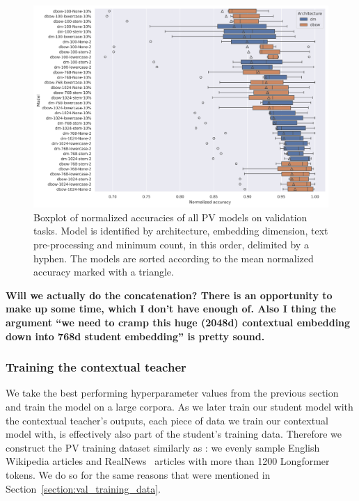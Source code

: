 \begin{figure}
    \includegraphics[width=\textwidth]{./img/pv_val_scores.png}

    \caption{Boxplot of normalized accuracies of all PV models on validation
    tasks. Model is identified by architecture, embedding dimension, text
    pre-processing and minimum count, in this order, delimited by a hyphen. The
    models are sorted according to the mean normalized accuracy marked with a
    triangle.}

    \label{fig:pv_val_scores}
\end{figure}

\textbf{Will we actually do the concatenation? There is an opportunity to make
up some time, which I don't have enough of. Also I thing the argument ``we need
to cramp this huge (2048d) contextual embedding down into 768d student
embedding'' is pretty sound.}

\subsubsection{Training the contextual teacher}

We take the best performing hyperparameter values from the previous section and
train the model on a large corpora. As we later train our student model with the
contextual teacher's outputs, each piece of data we train our contextual model
with, is effectively also part of the student's training data. Therefore we
construct the PV training dataset similarly as : we evenly
sample English Wikipedia articles and RealNews~\citep{zellers2019defending}
articles with more than 1200 Longformer tokens. We do so for the same reasons
that were mentioned in Section~\ref{section:val_training_data}.

